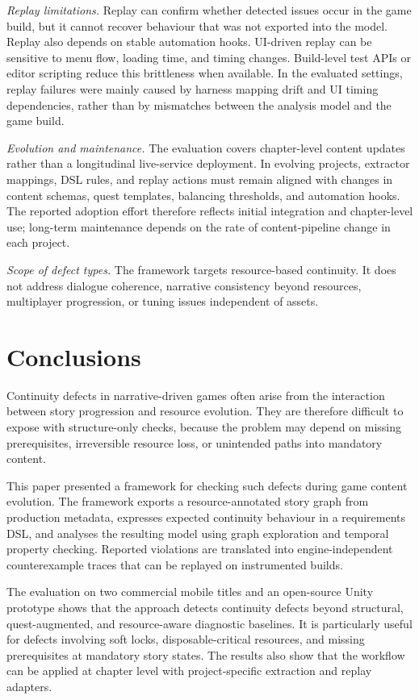 \documentclass[conference]{IEEEtran}
\begin{document}
\noindent\emph{Replay limitations.}
Replay can confirm whether detected issues occur in the game build, but it
cannot recover behaviour that was not exported into the model. Replay also
depends on stable automation hooks. UI-driven replay can be sensitive to
menu flow, loading time, and timing changes. Build-level test APIs or
editor scripting reduce this brittleness when available. In the evaluated
settings, replay failures were mainly caused by harness mapping drift and
UI timing dependencies, rather than by mismatches between the analysis
model and the game build.

\noindent\emph{Evolution and maintenance.}
The evaluation covers chapter-level content updates rather than a
longitudinal live-service deployment. In evolving projects, extractor
mappings, DSL rules, and replay actions must remain aligned with changes
in content schemas, quest templates, balancing thresholds, and automation
hooks. The reported adoption effort therefore reflects initial
integration and chapter-level use; long-term maintenance depends on the
rate of content-pipeline change in each project.

\noindent\emph{Scope of defect types.}
The framework targets resource-based continuity. It does not address
dialogue coherence, narrative consistency beyond resources, multiplayer
progression, or tuning issues independent of assets.

\section{Conclusions}
\label{sec:conclusion}

Continuity defects in narrative-driven games often arise from the
interaction between story progression and resource evolution. They are
therefore difficult to expose with structure-only checks, because the
problem may depend on missing prerequisites, irreversible resource loss,
or unintended paths into mandatory content.

This paper presented a framework for checking such defects during game
content evolution. The framework exports a resource-annotated story graph
from production metadata, expresses expected continuity behaviour in a
requirements DSL, and analyses the resulting model using graph
exploration and temporal property checking. Reported violations are
translated into engine-independent counterexample traces that can be
replayed on instrumented builds.

The evaluation on two commercial mobile titles and an open-source Unity
prototype shows that the approach detects continuity defects beyond
structural, quest-augmented, and resource-aware diagnostic baselines. It
is particularly useful for defects involving soft locks,
disposable-critical resources, and missing prerequisites at mandatory
story states. The results also show that the workflow can be applied at
chapter level with project-specific extraction and replay adapters.
\end{document}
